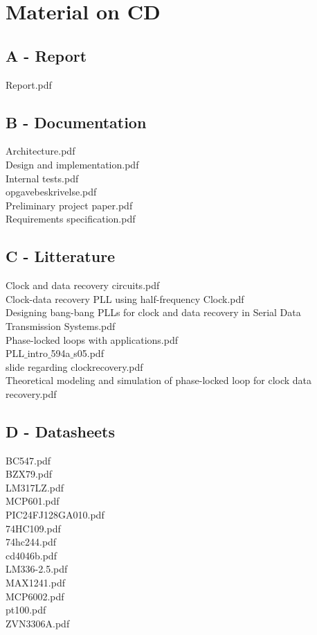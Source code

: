 \chapter{Material on CD}
\section{A - Report}
Report.pdf\\
\section{B - Documentation}
Architecture.pdf\\
Design and implementation.pdf\\
Internal tests.pdf\\
opgavebeskrivelse.pdf\\
Preliminary project paper.pdf\\
Requirements specification.pdf\\
\section{C - Litterature}
Clock and data recovery circuits.pdf\\
Clock-data recovery PLL using half-frequency Clock.pdf\\
Designing bang-bang PLLs for clock and data recovery in Serial Data Transmission Systems.pdf\\
Phase-locked loops with applications.pdf\\
PLL$\_$intro$\_$594a$\_$s05.pdf\\
slide regarding clockrecovery.pdf\\
Theoretical modeling and simulation of phase-locked loop for clock data recovery.pdf\\
\section{D - Datasheets}
BC547.pdf\\
BZX79.pdf\\
LM317LZ.pdf\\
MCP601.pdf\\
PIC24FJ128GA010.pdf\\
74HC109.pdf\\
74hc244.pdf\\
cd4046b.pdf\\
LM336-2.5.pdf\\
MAX1241.pdf\\
MCP6002.pdf\\
pt100.pdf\\
ZVN3306A.pdf\\
